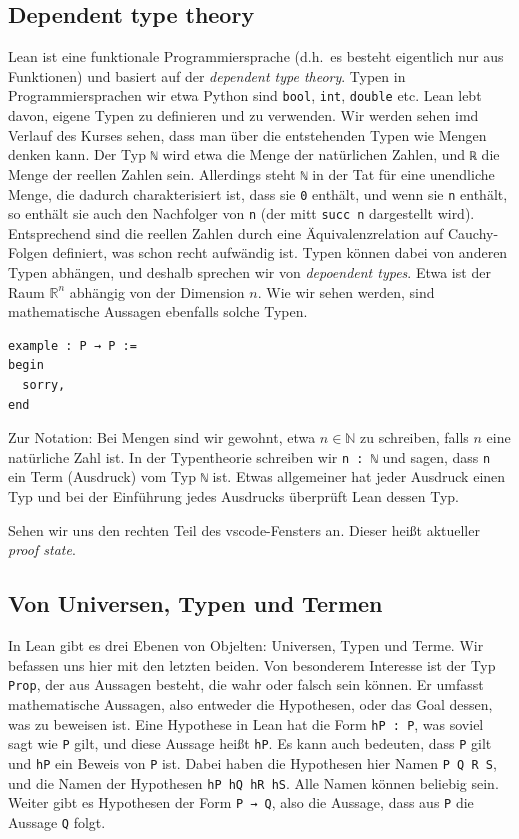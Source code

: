 \documentclass[11pt]{article}
\newcommand{\leanstate}{\texttt}
\begin{document}
\subsection{Dependent type theory}
Lean ist eine funktionale Programmiersprache (d.h.\ es besteht eigentlich nur aus Funktionen) und basiert auf der {\em dependent type theory}. Typen in Programmiersprachen wir etwa Python sind {\tt bool}, {\tt int}, {\tt double} etc. Lean lebt davon, eigene Typen zu definieren und zu verwenden. Wir werden sehen imd Verlauf des Kurses sehen, dass man über die entstehenden Typen wie Mengen denken kann. Der Typ \leanstate{ℕ} wird etwa die Menge der natürlichen Zahlen, und \leanstate{ℝ} die Menge der reellen Zahlen sein. Allerdings steht \leanstate{ℕ} in der Tat für eine unendliche Menge, die dadurch charakterisiert ist, dass sie \leanstate{0} enthält, und wenn sie \leanstate{n} enthält, so enthält sie auch den Nachfolger von \leanstate{n} (der mitt \leanstate{succ n} dargestellt wird). Entsprechend sind die reellen Zahlen durch eine Äquivalenzrelation auf Cauchy-Folgen definiert, was schon recht aufwändig ist. Typen können dabei von anderen Typen abhängen, und deshalb sprechen wir von {\em depoendent types}. Etwa ist der Raum $\mathbb R^n$ abhängig von der Dimension $n$. Wie wir sehen werden, sind mathematische Aussagen ebenfalls solche Typen.
\begin{verbatim}
example : P → P := 
begin
  sorry,
end
\end{verbatim}

Zur Notation: Bei Mengen sind wir gewohnt, etwa $n\in\mathbb N$ zu schreiben, falls $n$ eine natürliche Zahl ist. In der Typentheorie schreiben wir \leanstate{n : ℕ} und sagen, dass \leanstate{n} ein Term (Ausdruck) vom Typ \leanstate{ℕ} ist. Etwas allgemeiner hat jeder Ausdruck einen Typ und bei der Einführung jedes Ausdrucks überprüft Lean dessen Typ. 



Sehen wir uns den rechten Teil des vscode-Fensters an. Dieser heißt aktueller {\em proof state}.
\subsection{Von Universen, Typen und Termen}
In Lean gibt es drei Ebenen von Objelten: Universen, Typen und Terme. Wir befassen uns hier mit den letzten beiden. Von besonderem Interesse ist der Typ {\tt Prop}, der aus Aussagen besteht, die wahr oder falsch sein können. Er umfasst mathematische Aussagen, also entweder die Hypothesen, oder das Goal dessen, was zu beweisen ist.  Eine Hypothese in Lean hat die Form \leanstate{hP : P}, was soviel sagt wie \leanstate{P} gilt, und diese Aussage heißt \leanstate{hP}. Es kann auch bedeuten, dass \leanstate{P} gilt und \leanstate{hP} ein Beweis von \leanstate{P} ist. Dabei haben die Hypothesen hier Namen \leanstate{P Q R S}, und die Namen der Hypothesen \leanstate{hP hQ hR hS}. Alle Namen können beliebig sein. Weiter gibt es Hypothesen der Form \leanstate{P → Q}, also die Aussage, dass aus \leanstate{P} die Aussage \leanstate{Q} folgt. 
\end{document}
